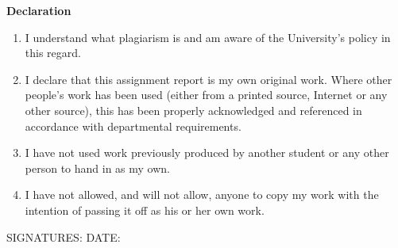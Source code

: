 {\textbf{Declaration}
\begin{enumerate}
\item I understand what plagiarism is and am aware of the University's
  policy in this regard.
\item I declare that this assignment report is my own original work.
  Where other people's work has been used (either from a printed source,
  Internet or any other source), this has been properly acknowledged and
  referenced in accordance with departmental requirements.
\item I have not used work previously produced by another student or any
  other person to hand in as my own.
\item I have not allowed, and will not allow, anyone to copy my work with
  the intention of passing it off as his or her own work.
\end{enumerate}

\vspace*{1cm}

SIGNATURES: \makebox[3in]{\hrulefill} \quad DATE: \makebox[1.5in]{\hrulefill}
}

\newpage


